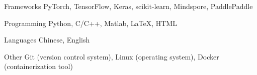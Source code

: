 

\begin{cvskills}

  \cvskill
    {Frameworks} %
    {PyTorch, TensorFlow, Keras, scikit-learn, Mindspore, PaddlePaddle} %


  \cvskill
    {Programming} %
    {Python, C/C++, Matlab, LaTeX, HTML} %

  \cvskill
    {Languages} %
    {Chinese, English} %

      \cvskill
    {Other} %
    {Git (version control system), Linux (operating system), Docker (containerization tool)} %

\end{cvskills}
